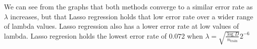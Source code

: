 \documentclass{article}
\begin{document}
We can see from the graphs that both methods converge to a similar error rate as $\lambda$ increases, but that Lasso regression holds that low error rate over a wider range of lambda values. Lasso regression also has a lower error rate at low values of lambda. Lasso regresion holds the lowest error rate of $0.072$ when $\lambda = \sqrt{\frac{\log D}{n_{\text{train}}}}2^{-6}$
\end{document}
